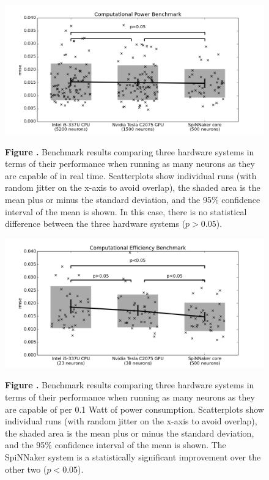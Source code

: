 \documentclass{frontiersSCNS} %
\begin{document}
\begin{figure}[h!]
\begin{center}
\includegraphics[width=18cm]{figures/plot_compute}
\end{center}
 \textbf{\label{fig:analysis_compute} Figure .}{ Benchmark results comparing three hardware systems
     in terms of their performance when running as many neurons as they are capable of in real time.  Scatterplots show individual runs (with random
     jitter on the x-axis to avoid overlap), the 
     shaded area is the mean plus or minus the standard deviation, and the 95\% confidence interval of the mean is shown.  In this case,
 there is no statistical difference between the three hardware systems ($p>0.05$).}
\end{figure}

\begin{figure}[h!]
\begin{center}
\includegraphics[width=18cm]{figures/plot_power}
\end{center}
 \textbf{\label{fig:analysis_power} Figure .}{ Benchmark results comparing three hardware systems
     in terms of their performance when running as many neurons as they are capable of per 0.1 Watt of power consumption.  Scatterplots show individual runs (with random jitter on the x-axis to avoid overlap), the 
     shaded area is the mean plus or minus the standard deviation, and the 95\% confidence interval of the mean is shown.  The SpiNNaker system is a statistically
 significant improvement over the other two ($p<0.05$).}
\end{figure}
\end{document}
